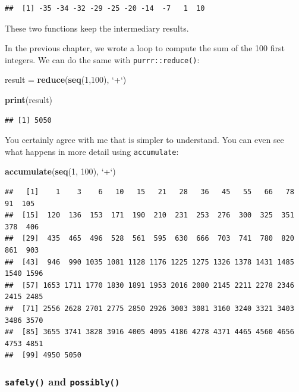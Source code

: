 \documentclass[]{gitbook}
\newenvironment{Shaded}{\begin{snugshade}}{\end{snugshade}}
\newcommand{\DataTypeTok}[1]{\textcolor[rgb]{0.13,0.29,0.53}{#1}}
\newcommand{\DecValTok}[1]{\textcolor[rgb]{0.00,0.00,0.81}{#1}}
\newcommand{\KeywordTok}[1]{\textcolor[rgb]{0.13,0.29,0.53}{\textbf{#1}}}
\newcommand{\NormalTok}[1]{#1}
\newcommand{\StringTok}[1]{\textcolor[rgb]{0.31,0.60,0.02}{#1}}
\theoremstyle{definition}
\theoremstyle{definition}
\theoremstyle{definition}
\theoremstyle{remark}
\begin{document}
\begin{verbatim}
##  [1] -35 -34 -32 -29 -25 -20 -14  -7   1  10
\end{verbatim}

These two functions keep the intermediary results.

In the previous chapter, we wrote a loop to compute the sum of the 100
first integers. We can do the same with \texttt{purrr::reduce()}:

\begin{Shaded}
\begin{Highlighting}[]
\NormalTok{result =}\StringTok{ }\KeywordTok{reduce}\NormalTok{(}\KeywordTok{seq}\NormalTok{(}\DecValTok{1}\NormalTok{,}\DecValTok{100}\NormalTok{), }\StringTok{`}\DataTypeTok{+}\StringTok{`}\NormalTok{)}

\KeywordTok{print}\NormalTok{(result)}
\end{Highlighting}
\end{Shaded}

\begin{verbatim}
## [1] 5050
\end{verbatim}

You certainly agree with me that is simpler to understand. You can even
see what happens in more detail using \texttt{accumulate}:

\begin{Shaded}
\begin{Highlighting}[]
\KeywordTok{accumulate}\NormalTok{(}\KeywordTok{seq}\NormalTok{(}\DecValTok{1}\NormalTok{, }\DecValTok{100}\NormalTok{), }\StringTok{`}\DataTypeTok{+}\StringTok{`}\NormalTok{)}
\end{Highlighting}
\end{Shaded}

\begin{verbatim}
##   [1]    1    3    6   10   15   21   28   36   45   55   66   78   91  105
##  [15]  120  136  153  171  190  210  231  253  276  300  325  351  378  406
##  [29]  435  465  496  528  561  595  630  666  703  741  780  820  861  903
##  [43]  946  990 1035 1081 1128 1176 1225 1275 1326 1378 1431 1485 1540 1596
##  [57] 1653 1711 1770 1830 1891 1953 2016 2080 2145 2211 2278 2346 2415 2485
##  [71] 2556 2628 2701 2775 2850 2926 3003 3081 3160 3240 3321 3403 3486 3570
##  [85] 3655 3741 3828 3916 4005 4095 4186 4278 4371 4465 4560 4656 4753 4851
##  [99] 4950 5050
\end{verbatim}

\hypertarget{safely-and-possibly}{%
\subsubsection{\texorpdfstring{\texttt{safely()} and
\texttt{possibly()}}{safely() and possibly()}}\label{safely-and-possibly}}
\end{document}
